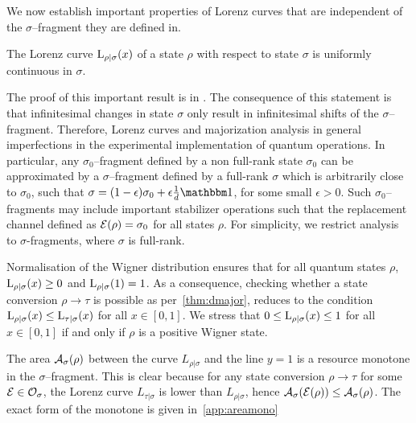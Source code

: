 \documentclass[pra,
aps,
twocolumn,
superscriptaddress,
groupedaddress,
nofootinbib,
reprint
]{revtex4-1}
\begin{document}
We now establish important properties of Lorenz curves that are independent of the $\sigma$--fragment they are defined in.
\begin{proposition}\label{thm:lccont}
	The Lorenz curve ${{\rm{L}}_{\rho|\sigma}}(x)$ of a state $\rho$ with respect to state $\sigma$ is uniformly continuous in $\sigma$. 
	 
\end{proposition}
The proof of this important result is in .
The consequence of this statement is that infinitesimal changes in state $\sigma$ only result in infinitesimal shifts of the $\sigma$--fragment.
Therefore, Lorenz curves and majorization analysis in general  imperfections in the experimental implementation of quantum operations.
In particular, any $\sigma_0$--fragment defined by a non full-rank state $\sigma_0$ can be approximated by a $\sigma$--fragment defined by a full-rank $\sigma$ which is arbitrarily close to $\sigma_0$, such that $\sigma = (1-\epsilon)\sigma_0 + \epsilon\frac{1}{d}\id$, for some small $\epsilon > 0$.
Such $\sigma_0$--fragments may include important stabilizer operations such that the replacement channel defined as $\mathcal{E}(\rho) = \sigma_0$ for all states $\rho$.
For simplicity, we restrict analysis to $\sigma$-fragments, where $\sigma$ is full-rank.

Normalisation of the Wigner distribution  ensures that for all quantum states $\rho$, ${{\rm{L}}_{\rho|\sigma}}(x) \geq 0$ and ${{\rm{L}}_{\rho|\sigma}}(1) = 1$.
As a consequence, checking whether a state conversion $\rho \longrightarrow \tau$ is possible as per~\cref{thm:dmajor}, reduces to the condition ${{\rm{L}}_{\rho|\sigma}}(x) \leq {{\rm{L}}_{\tau|\sigma}}(x)$ for all $x \in [0,1]$.
We stress that $0 \leq {{\rm{L}}_{\rho|\sigma}}(x) \leq 1$ for all $x \in [0,1]$ if and only if $\rho$ is a positive Wigner state.

The area ${\mathcal A}_\sigma(\rho)$ between the curve $L_{\rho|\sigma}$ and the line $y=1$ is a resource monotone in the $\sigma$--fragment. 
This is clear because for any state conversion $\rho \longrightarrow \tau$ for some $\mathcal{E} \in \mathcal{O}_\sigma$, the Lorenz curve $L_{\tau|\sigma}$ is lower than $L_{\rho|\sigma}$, hence ${\mathcal A}_\sigma(\mathcal{E}(\rho)) \leq {\mathcal A}_\sigma(\rho)$.
The exact form of the monotone is given in~\cref{app:areamono}
\end{document}
